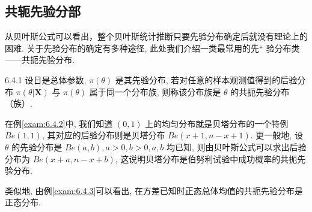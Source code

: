 \subsection{共轭先验分部}\label{ssec:6.4.4}

从贝叶斯公式可以看出，整个贝叶斯统计推断只要先验分布确定后就没有理论上的困难. 关于先验分布的确定有多种途径, 此处我们介绍一类最常用的先“
验分布类——共扼先验分布.

\begin{definition}{}{6.4.1}
设日是总体参数, $\pi(\theta)$ 是其先验分布, 若对任意的样本观测值得到的后验分布 $\pi(\theta|\boldsymbol{X})$ 与 $\pi(\theta)$ 属于同一个分布族, 则称该分布族是 $\theta$ 的共扼先验分布（族）.
\end{definition}

\begin{example}\label{exam:6.4.4}
在例\ref{exam:6.4.2}中, 我们知道 $(0,1)$ 上的均匀分布就是贝塔分布的一个特例 $Be(1,1)$, 其对应的后验分布则是贝塔分布 $B e(x+1, n-x+1)$. 更一般地, 设 $\theta$ 的先验分布是 $B e(a, b), a>0, b>0, a, b$ 均已知, 则由贝叶斯公式可以求出后验分布为 $B e(x+a, n-x+b)$, 这说明贝塔分布是伯努利试验中成功概率的共扼先验分布.
\end{example}
类似地, 由例\ref{exam:6.4.3}可以看出, 在方差已知时正态总体均值的共扼先验分布是正态分布.



